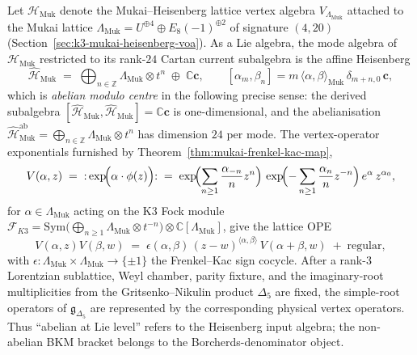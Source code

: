 \begin{theorem}
\label{thm:k3-yangian-frenkel-kac-closure}
Let $\mathcal{H}_{\mathrm{Muk}}$ denote the Mukai--Heisenberg lattice vertex algebra
$V_{\Lambda_{\mathrm{Muk}}}$ attached to the Mukai lattice
$\Lambda_{\mathrm{Muk}} = U^{\oplus 4}\oplus E_8(-1)^{\oplus 2}$ of signature $(4,20)$
(Section~\ref{sec:k3-mukai-heisenberg-voa}). As a Lie algebra, the mode algebra of
$\mathcal{H}_{\mathrm{Muk}}$ restricted to its rank-$24$ Cartan current subalgebra
is the affine Heisenberg
\[
 \widehat{\mathcal{H}}_{\mathrm{Muk}}
 \;=\;
 \bigoplus_{n\in\mathbb{Z}}\Lambda_{\mathrm{Muk}}\otimes t^n\;\oplus\;\mathbb{C}\mathbf{c},
 \qquad
 [\alpha_m,\beta_n] = m\,\langle\alpha,\beta\rangle_{\mathrm{Muk}}\,\delta_{m+n,0}\,\mathbf{c},
\]
which is \emph{abelian modulo centre} in the following precise sense: the derived
subalgebra $[\widehat{\mathcal{H}}_{\mathrm{Muk}},\widehat{\mathcal{H}}_{\mathrm{Muk}}]
= \mathbb{C}\mathbf{c}$ is one-dimensional, and the abelianisation
$\widehat{\mathcal{H}}_{\mathrm{Muk}}^{\mathrm{ab}} =
\bigoplus_{n\in\mathbb{Z}}\Lambda_{\mathrm{Muk}}\otimes t^n$ has dimension $24$ per
mode. The vertex-operator exponentials furnished by
Theorem~\ref{thm:mukai-frenkel-kac-map},
\[
 V(\alpha, z)
 \;=\;
 {:}\exp\!\Bigl(\alpha\cdot\phi(z)\Bigr){:}
 \;=\;
 \exp\!\Bigl(\sum_{n\geq 1}\frac{\alpha_{-n}}{n}z^n\Bigr)\,
 \exp\!\Bigl(-\sum_{n\geq 1}\frac{\alpha_n}{n}z^{-n}\Bigr)\,
 e^{\alpha}\,z^{\alpha_0},
\]
for $\alpha\in\Lambda_{\mathrm{Muk}}$ acting on the K3 Fock module $\mathcal{F}_{K3}
= \mathrm{Sym}\!\bigl(\bigoplus_{n\geq 1}\Lambda_{\mathrm{Muk}}\otimes t^{-n}\bigr)
\otimes\mathbb{C}[\Lambda_{\mathrm{Muk}}]$, give the lattice OPE
\[
 V(\alpha,z)V(\beta,w)
 \;=\;
 \epsilon(\alpha,\beta)\,(z-w)^{\langle\alpha,\beta\rangle}\,
 V(\alpha+\beta,w)\;+\;\text{regular},
\]
with $\epsilon\colon \Lambda_{\mathrm{Muk}}\times\Lambda_{\mathrm{Muk}}\to\{\pm 1\}$
the Frenkel--Kac sign cocycle. After a rank-$3$ Lorentzian sublattice,
Weyl chamber, parity fixture, and the imaginary-root multiplicities from
the Gritsenko--Nikulin product $\Delta_5$ are fixed, the simple-root
operators of $\mathfrak{g}_{\Delta_5}$ are represented by the corresponding
physical vertex operators. Thus ``abelian at Lie level'' refers to the
Heisenberg input algebra; the non-abelian BKM bracket belongs to the
Borcherds-denominator object.
\end{theorem}

